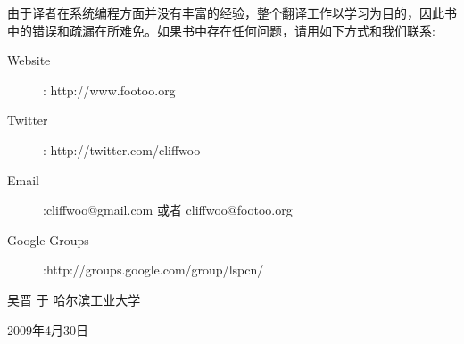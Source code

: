 由于译者在系统编程方面并没有丰富的经验，整个翻译工作以学习为目的，因此书中的错误和疏漏在所难免。如果书中存在任何问题，请用如下方式和我们联系:
\begin{center}
\begin{description}
	\item[Website]: http://www.footoo.org
	\item[Twitter]: http://twitter.com/cliffwoo
	\item[Email]:\mbox{cliffwoo@gmail.com} 或者 \mbox{cliffwoo@footoo.org}
	\item[Google Groups]:http://groups.google.com/group/lspcn/
\end{description}
\end{center}
\begin{flushright}
	吴晋 于 哈尔滨工业大学\linebreak[2]
	
	2009年4月30日
\end{flushright}
